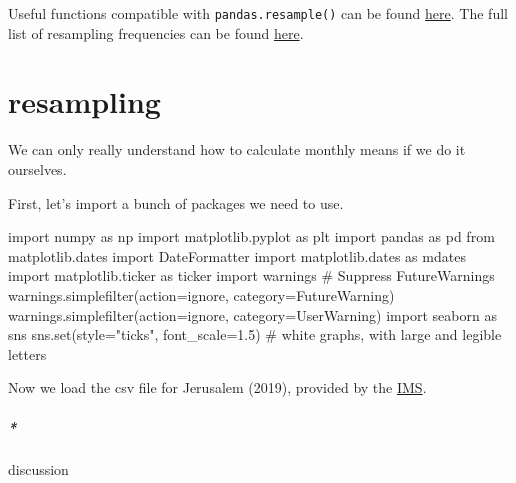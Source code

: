 \documentclass[
  letterpaper,
  DIV=11,
  numbers=noendperiod,
  oneside]{scrreprt}
\let\oldparagraph\paragraph
\renewcommand{\paragraph}[1]{\oldparagraph{#1}\mbox{}}
\newenvironment{Shaded}{\begin{snugshade}}{\end{snugshade}}
\newcommand{\BuiltInTok}[1]{\textcolor[rgb]{0.00,0.23,0.31}{#1}}
\newcommand{\CommentTok}[1]{\textcolor[rgb]{0.37,0.37,0.37}{#1}}
\newcommand{\FloatTok}[1]{\textcolor[rgb]{0.68,0.00,0.00}{#1}}
\newcommand{\ImportTok}[1]{\textcolor[rgb]{0.00,0.46,0.62}{#1}}
\newcommand{\NormalTok}[1]{\textcolor[rgb]{0.00,0.23,0.31}{#1}}
\newcommand{\OperatorTok}[1]{\textcolor[rgb]{0.37,0.37,0.37}{#1}}
\newcommand{\PreprocessorTok}[1]{\textcolor[rgb]{0.68,0.00,0.00}{#1}}
\newcommand{\StringTok}[1]{\textcolor[rgb]{0.13,0.47,0.30}{#1}}
\begin{document}
Useful functions compatible with \texttt{pandas.resample()} can be found
\href{https://pandas.pydata.org/docs/reference/resampling.html\#computations-descriptive-stats}{here}.
The full list of resampling frequencies can be found
\href{https://pandas.pydata.org/pandas-docs/version/0.12.0/timeseries.html\#offset-aliases}{here}.

\hypertarget{resampling-1}{%
\chapter{resampling}\label{resampling-1}}

We can only really understand how to calculate monthly means if we do it
ourselves.

First, let's import a bunch of packages we need to use.

\begin{Shaded}
\begin{Highlighting}[]
\ImportTok{import}\NormalTok{ numpy }\ImportTok{as}\NormalTok{ np}
\ImportTok{import}\NormalTok{ matplotlib.pyplot }\ImportTok{as}\NormalTok{ plt}
\ImportTok{import}\NormalTok{ pandas }\ImportTok{as}\NormalTok{ pd}
\ImportTok{from}\NormalTok{ matplotlib.dates }\ImportTok{import}\NormalTok{ DateFormatter}
\ImportTok{import}\NormalTok{ matplotlib.dates }\ImportTok{as}\NormalTok{ mdates}
\ImportTok{import}\NormalTok{ matplotlib.ticker }\ImportTok{as}\NormalTok{ ticker}
\ImportTok{import}\NormalTok{ warnings}
\CommentTok{\# Suppress FutureWarnings}
\NormalTok{warnings.simplefilter(action}\OperatorTok{=}\StringTok{\textquotesingle{}ignore\textquotesingle{}}\NormalTok{, category}\OperatorTok{=}\PreprocessorTok{FutureWarning}\NormalTok{)}
\NormalTok{warnings.simplefilter(action}\OperatorTok{=}\StringTok{\textquotesingle{}ignore\textquotesingle{}}\NormalTok{, category}\OperatorTok{=}\PreprocessorTok{UserWarning}\NormalTok{)}
\ImportTok{import}\NormalTok{ seaborn }\ImportTok{as}\NormalTok{ sns}
\NormalTok{sns.}\BuiltInTok{set}\NormalTok{(style}\OperatorTok{=}\StringTok{"ticks"}\NormalTok{, font\_scale}\OperatorTok{=}\FloatTok{1.5}\NormalTok{)  }\CommentTok{\# white graphs, with large and legible letters}
\end{Highlighting}
\end{Shaded}

Now we load the csv file for Jerusalem (2019), provided by the
\href{https://ims.gov.il/en/data_gov}{IMS}.

\hypertarget{discussion-2}{%
\paragraph*{discussion}\label{discussion-2}}
\end{document}
